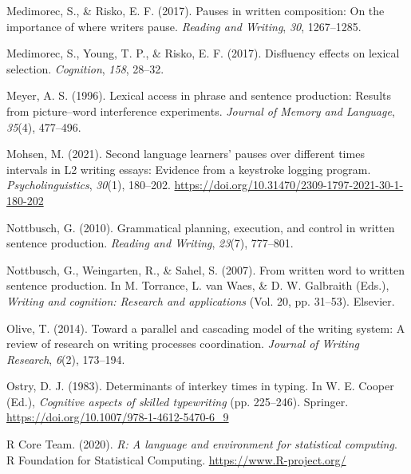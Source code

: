 \documentclass[
  man,floatsintext]{apa7}
\newlength{\cslhangindent}
\newlength{\cslentryspacingunit} %
\newenvironment{CSLReferences}[2] %
 {%
  \setlength{\parindent}{0pt}
  \ifodd #1
  \let\oldpar\par
  \def\par{\hangindent=\cslhangindent\oldpar}
  \fi
  \setlength{\parskip}{#2\cslentryspacingunit}
 }%
 {}
\begin{document}
\begin{CSLReferences}{1}{0}
\leavevmode{}%
Medimorec, S., \& Risko, E. F. (2017). Pauses in written composition: On the importance of where writers pause. \emph{Reading and Writing}, \emph{30}, 1267--1285.

\leavevmode{}%
Medimorec, S., Young, T. P., \& Risko, E. F. (2017). Disfluency effects on lexical selection. \emph{Cognition}, \emph{158}, 28--32.

\leavevmode{}%
Meyer, A. S. (1996). Lexical access in phrase and sentence production: Results from picture--word interference experiments. \emph{Journal of Memory and Language}, \emph{35}(4), 477--496.

\leavevmode{}%
Mohsen, M. (2021). Second language learners' pauses over different times intervals in {L2} writing essays: Evidence from a keystroke logging program. \emph{Psycholinguistics}, \emph{30}(1), 180--202. \url{https://doi.org/10.31470/2309-1797-2021-30-1-180-202}

\leavevmode{}%
Nottbusch, G. (2010). Grammatical planning, execution, and control in written sentence production. \emph{Reading and Writing}, \emph{23}(7), 777--801.

\leavevmode{}%
Nottbusch, G., Weingarten, R., \& Sahel, S. (2007). From written word to written sentence production. In M. Torrance, L. van Waes, \& D. W. Galbraith (Eds.), \emph{Writing and cognition: Research and applications} (Vol. 20, pp. 31--53). Elsevier.

\leavevmode{}%
Olive, T. (2014). Toward a parallel and cascading model of the writing system: {A} review of research on writing processes coordination. \emph{Journal of Writing Research}, \emph{6}(2), 173--194.

\leavevmode{}%
Ostry, D. J. (1983). Determinants of interkey times in typing. In W. E. Cooper (Ed.), \emph{Cognitive aspects of skilled typewriting} (pp. 225--246). Springer. \url{https://doi.org/10.1007/978-1-4612-5470-6_9}

\leavevmode{}%
R Core Team. (2020). \emph{R: A language and environment for statistical computing}. R Foundation for Statistical Computing. \url{https://www.R-project.org/}


\end{CSLReferences}
\end{document}
